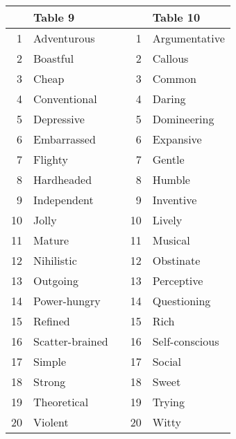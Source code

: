 \documentclass[12pt]{article}
\begin{document}
\begin{tabular}{r|l l r|l}
 & Table 9 & & & Table 10 \\\hline
 1 & Adventurous & &  1 & Argumentative\\
 2 & Boastful & &  2 & Callous\\
 3 & Cheap & &  3 & Common\\
 4 & Conventional & &  4 & Daring\\
 5 & Depressive & &  5 & Domineering\\
 6 & Embarrassed & &  6 & Expansive\\
 7 & Flighty & &  7 & Gentle\\
 8 & Hardheaded & &  8 & Humble\\
 9 & Independent & &  9 & Inventive\\
10 & Jolly & & 10 & Lively\\
11 & Mature & & 11 & Musical\\
12 & Nihilistic & & 12 & Obstinate\\
13 & Outgoing & & 13 & Perceptive\\
14 & Power-hungry & & 14 & Questioning\\
15 & Refined & & 15 & Rich\\
16 & Scatter-brained & & 16 & Self-conscious\\
17 & Simple & & 17 & Social\\
18 & Strong & & 18 & Sweet\\
19 & Theoretical & & 19 & Trying\\
20 & Violent & & 20 & Witty\\
\end{tabular}
\end{document}
